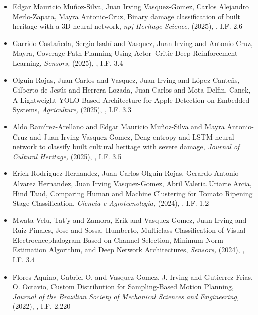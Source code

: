 \begin{itemize} 
\item Edgar Mauricio Mu\~noz-Silva, Juan Irving Vasquez-Gomez, Carlos Alejandro Merlo-Zapata, Mayra Antonio-Cruz, Binary damage classification of built heritage with a 3D neural network,\textit{ npj Heritage Science,} (2025), \href{https://doi.org/10.1038/s40494-025-01597-y} {\faExternalLink}, I.F. 2.6 
\item Garrido-Castañeda, Sergio Isahí and Vasquez, Juan Irving and Antonio-Cruz, Mayra, Coverage Path Planning Using Actor–Critic Deep Reinforcement Learning,\textit{ Sensors,} (2025), \href{https://doi.org/10.3390/s25051592} {\faExternalLink}, I.F. 3.4 
\item Olguín-Rojas, Juan Carlos and Vasquez, Juan Irving and López-Canteñs, Gilberto de Jesús and Herrera-Lozada, Juan Carlos and Mota-Delfin, Canek, A Lightweight YOLO-Based Architecture for Apple Detection on Embedded Systems,\textit{ Agriculture,} (2025), \href{https://doi.org/10.3390/agriculture15080838} {\faExternalLink}, I.F. 3.3 
\item Aldo Ramírez-Arellano and Edgar Mauricio Muñoz-Silva and Mayra Antonio-Cruz and Juan Irving Vasquez-Gomez, Deng entropy and LSTM neural network to classify built cultural heritage with severe damage,\textit{ Journal of Cultural Heritage,} (2025), \href{https://doi.org/10.1016/j.culher.2025.04.003} {\faExternalLink}, I.F. 3.5 
\item Erick Rodriguez Hernandez, Juan Carlos Olguin Rojas, Gerardo Antonio Alvarez Hernandez, Juan Irving Vasquez-Gomez, Abril Valeria Uriarte Arcia, Hind Taud, Comparing Human and Machine Clustering for Tomato Ripening Stage Classification,\textit{ Ciencia e Agrotecnología,} (2024), \href{https://doi.org/10.1590/1413-7054202448019123} {\faExternalLink}, I.F. 1.2 
\item Mwata-Velu, Tat’y and Zamora, Erik and Vasquez-Gomez, Juan Irving and Ruiz-Pinales, Jose and Sossa, Humberto, Multiclass Classification of Visual Electroencephalogram Based on Channel Selection, Minimum Norm Estimation Algorithm, and Deep Network Architectures,\textit{ Sensors,} (2024), \href{https://doi.org/10.3390/s24123968} {\faExternalLink}, I.F. 3.4 
\item Flores-Aquino, Gabriel O. and Vasquez-Gomez, J. Irving and Gutierrez-Frias, O. Octavio, Custom Distribution for Sampling-Based Motion Planning,\textit{ Journal of the Brazilian Society of Mechanical Sciences and Engineering,} (2022), \href{https://doi.org/10.1007/s40430-022-03379-0} {\faExternalLink}, I.F. 2.220 

\end{itemize}
